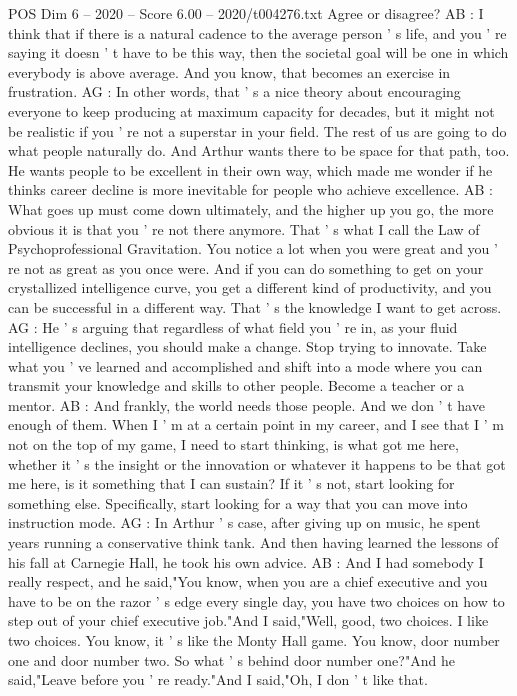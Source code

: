 \begin{textsample}{POS Dim 6 – 2020 – Score 6.00 – 2020/t004276.txt}
Agree or disagree?
AB : I think that if there is a natural cadence to the average person ' s life, and you ' re saying it doesn ' t have to be this way, then the societal goal will be one in which everybody is above average.
And you know, that becomes an exercise in frustration.
AG : In other words, that ' s a nice theory about encouraging everyone to keep producing at maximum capacity for decades, but it might not be realistic if you ' re not a superstar in your field.
The rest of us are going to do what people naturally do.
And Arthur wants there to be space for that path, too.
He wants people to be excellent in their own way, which made me wonder if he thinks career decline is more inevitable for people who achieve excellence.
AB : What goes up must come down ultimately, and the higher up you go, the more obvious it is that you ' re not there anymore.
That ' s what I call the Law of Psychoprofessional Gravitation.
You notice a lot when you were great and you ' re not as great as you once were.
And if you can do something to get on your crystallized intelligence curve, you get a different kind of productivity, and you can be successful in a different way.
That ' s the knowledge I want to get across.
AG : He ' s arguing that regardless of what field you ' re in, as your fluid intelligence declines, you should make a change.
Stop trying to innovate.
Take what you ' ve learned and accomplished and shift into a mode where you can transmit your knowledge and skills to other people.
Become a teacher or a mentor.
AB : And frankly, the world needs those people.
And we don ' t have enough of them.
When I ' m at a certain point in my career, and I see that I ' m not on the top of my game, I need to start thinking, is what got me here, whether it ' s the insight or the innovation or whatever it happens to be that got me here, is it something that I can sustain?
If it ' s not, start looking for something else.
Specifically, start looking for a way that you can move into instruction mode.
AG : In Arthur ' s case, after giving up on music, he spent years running a conservative think tank.
And then having learned the lessons of his fall at Carnegie Hall, he took his own advice.
AB : And I had somebody I really respect, and he said,"You know, when you are a chief executive and you have to be on the razor ' s edge every single day, you have two choices on how to step out of your chief executive job."And I said,"Well, good, two choices.
I like two choices.
You know, it ' s like the Monty Hall game.
You know, door number one and door number two.
So what ' s behind door number one?"And he said,"Leave before you ' re ready."And I said,"Oh, I don ' t like that.

\end{textsample}
